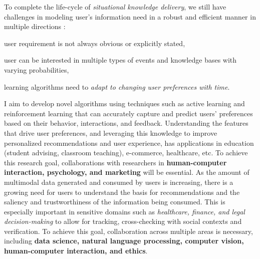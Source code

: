 To complete the life-cycle of \textit{situational knowledge delivery}, we still have challenges in modeling user's information need in a robust and efficient manner in multiple directions \cite{solaiman2021applying}:
\begin{enumerate*}[label=(\arabic*)]
    \item user requirement is not always obvious or explicitly stated,
    \item user can be interested in multiple types of events and knowledge bases with varying probabilities,
    \item learning algorithms need to \textit{adapt to changing user preferences with time}.
\end{enumerate*}
I aim to develop novel algorithms using techniques such as active learning and reinforcement learning that can accurately capture and predict users' preferences based on their behavior, interactions, and feedback.
Understanding the features that drive user preferences, and leveraging this knowledge to improve personalized recommendations and user experience, has applications in education (student advising, classroom teaching), e-commerce, healthcare, etc.
%
%
To achieve this research goal, collaborations with researchers in \textbf{ human-computer interaction, psychology, and marketing} will be essential. 
As the amount of multimodal data generated and consumed by users is increasing, there is a growing need for users to understand the basis for recommendations \cite{solaiman2022femmir}
and the saliency and trustworthiness of the information being consumed. This is especially important in sensitive domains such as \textit{healthcare, finance, and legal decision-making} to allow for tracking, cross-checking with social contexts and verification.
To achieve this goal, collaboration across multiple areas is necessary, including\textbf{ data science, 
natural language processing, computer vision,  human-computer interaction, and ethics}. 
